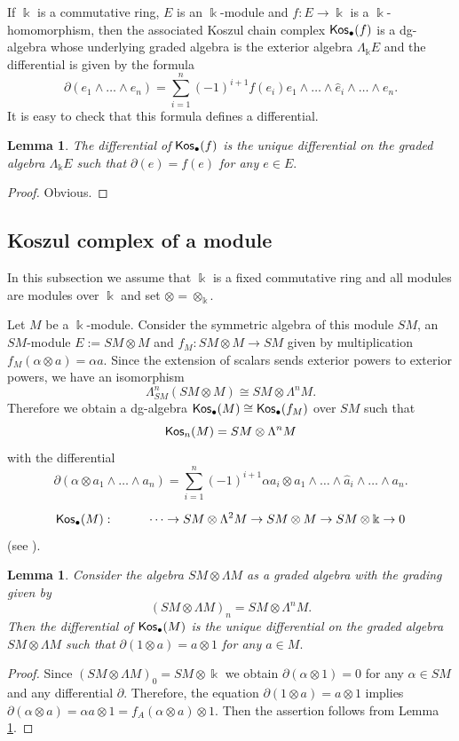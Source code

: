 \documentclass{amsart}
\numberwithin{equation}{section}
\newtheorem{lemma}[theorem]{Lemma}
\theoremstyle{definition}
\def\kk{\Bbbk}
\begin{document}
If $\kk$ is a commutative ring, $E$ is an $\kk$-module and $f:E\to \kk$ is a $\kk$-homomorphism, then the associated Koszul chain complex ${\sf Kos}_\bullet(f)$ is a dg-algebra whose underlying graded algebra is  the exterior algebra $\Lambda_\kk E$ and the differential is given by the formula
$$ \partial(e_1\wedge \dots \wedge e_n)=\sum_{i=1}^n (-1)^{i+1} f(e_i)e_1\wedge \dots \wedge \hat e_i \wedge \dots \wedge e_n.$$
It is easy to check that this formula defines a differential.   


\begin{lemma}\label{lemma_Kos(f)} The differential of ${\sf Kos}_\bullet(f)$ is the unique differential on the graded algebra $\Lambda_\kk E$  such that $\partial(e)=f(e)$ for any $e\in E.$
\end{lemma}
\begin{proof}
Obvious.
\end{proof}

\subsection{Koszul complex of a module}
 In this subsection we assume that $\kk$ is a fixed commutative ring and all modules are modules over $\kk$ and set $\otimes=\otimes_\kk.$

Let $M$ be a $\kk$-module. Consider the symmetric algebra of this module $SM$,  an $SM$-module $E:=SM\otimes M$ and $f_M:SM\otimes M\to SM$  given by multiplication $f_M(\alpha\otimes a)=\alpha a.$ Since the extension of scalars sends exterior powers to exterior powers, we have  an isomorphism
$$ \Lambda_{SM}^n (SM\otimes M) \cong SM \otimes \Lambda^nM. $$
Therefore we obtain a dg-algebra  ${\sf Kos}_\bullet(M)\cong{\sf Kos}_\bullet(f_M)$ over $SM$ such that  
$${\sf Kos}_n(M)=SM\otimes \Lambda^nM$$
with the differential
$$\partial(\alpha\otimes a_1\wedge \dots \wedge a_n )=\sum_{i=1}^n (-1)^{i+1} \alpha a_i \otimes a_1\wedge \dots \wedge  \hat a_i \wedge \dots \wedge a_n.$$

$${\sf Kos}_\bullet(M):  \hspace{1cm} \dots \to  SM\otimes \Lambda^2 M\to  SM\otimes M \to SM\otimes \kk \to 0$$
(see {\cite[4.3.1]{illusie2006complexe}}).



\begin{lemma}\label{lemma_Kos(A)} Consider the algebra $SM\otimes \Lambda M$ as a graded algebra with the grading given by  $$(SM\otimes \Lambda M)_n=SM\otimes \Lambda^n M.$$ Then the differential of ${\sf Kos}_\bullet(M)$ is the unique differential  on the graded algebra $SM\otimes \Lambda M$ such that $\partial(1\otimes a)=a\otimes 1$ for any $a\in M.$
\end{lemma}
\begin{proof}
Since $(SM\otimes \Lambda M)_0=SM\otimes \kk$ we obtain $\partial (\alpha \otimes 1 )=0$ for any $\alpha\in SM$ and any differential $\partial.$
Therefore, the equation $\partial(1\otimes a)=a\otimes 1$ implies $\partial(\alpha\otimes a) =\alpha a\otimes 1=f_A(\alpha\otimes  a)\otimes 1.$  Then the assertion follows from Lemma \ref{lemma_Kos(f)}. 
\end{proof}
\end{document}
